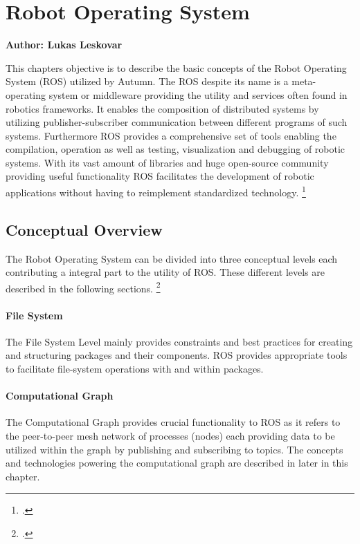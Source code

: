 \chapter{Robot Operating System}

\textbf{Author: Lukas Leskovar} 

This chapters objective is to describe the basic concepts of the Robot Operating System (ROS) utilized by Autumn. The ROS despite its name is a meta-operating system or middleware providing the utility and services often found in robotics frameworks. It enables the composition of distributed systems by utilizing publisher-subscriber communication between different programs of such systems. Furthermore ROS provides a comprehensive set of tools enabling the compilation, operation as well as testing, visualization and debugging of robotic systems. With its vast amount of libraries and huge open-source community providing useful functionality ROS facilitates the development of robotic applications without having to reimplement standardized technology. \footcite{openSourceRoboticsFoundationDefinitionNodate}


\section{Conceptual Overview}
The Robot Operating System can be divided into three conceptual levels each contributing a integral part to the utility of ROS. These different levels are described in the following sections. \footcite{openSourceRoboticsFoundationConceptsNodate}

\subsubsection{File System}
The File System Level mainly provides constraints and best practices for creating and structuring packages and their components. 
ROS provides appropriate tools to facilitate file-system operations with and within packages.

\subsubsection{Computational Graph}
The Computational Graph provides crucial functionality to ROS as it refers to the peer-to-peer mesh network of processes (nodes) each providing data to be utilized within the graph by publishing and subscribing to topics.
The concepts and technologies powering the computational graph are described in later in this chapter.

